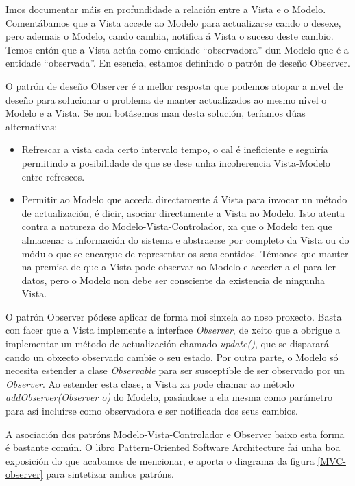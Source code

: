 Imos documentar máis en profundidade a relación entre a Vista e o Modelo. Comentábamos que a Vista accede ao Modelo para actualizarse cando o desexe, pero ademais o Modelo, cando cambia, notifica á Vista o suceso deste cambio. Temos entón que a Vista actúa como entidade ``observadora'' dun Modelo que é a entidade ``observada''. En esencia, estamos definindo o patrón de deseño Observer.

O patrón de deseño Observer é a mellor resposta que podemos atopar a nivel de deseño para solucionar o problema de manter actualizados ao mesmo nivel o Modelo e a Vista. Se non botásemos man desta solución, teríamos dúas alternativas:

\begin{itemize}
\item Refrescar a vista cada certo intervalo tempo, o cal é ineficiente e seguiría permitindo a posibilidade de que se dese unha incoherencia Vista-Modelo entre refrescos.
\item Permitir ao Modelo que acceda directamente á Vista para invocar un método de actualización, é dicir, asociar directamente a Vista ao Modelo. Isto atenta contra a natureza do Modelo-Vista-Controlador, xa que o Modelo ten que almacenar a información do sistema e abstraerse por completo da Vista ou do módulo que se encargue de representar os seus contidos. Témonos que manter na premisa de que a Vista pode observar ao Modelo e acceder a el para ler datos, pero o Modelo non debe ser consciente da existencia de ningunha Vista.
\end{itemize} 

O patrón Observer pódese aplicar de forma moi sinxela ao noso proxecto. Basta con facer que a Vista implemente a interface \textit{Observer}, de xeito que a obrigue a implementar un método de actualización chamado \textit{update()}, que se disparará cando un obxecto observado cambie o seu estado. Por outra parte, o Modelo só necesita estender a clase \textit{Observable} para ser susceptible de ser observado por un \textit{Observer}. Ao estender esta clase, a Vista xa pode chamar ao método \textit{addObserver(Observer o)} do Modelo, pasándose a ela mesma como parámetro para así incluírse como observadora e ser notificada dos seus cambios.

A asociación dos patróns Modelo-Vista-Controlador e Observer baixo esta forma é bastante común. O libro Pattern-Oriented Software Architecture \cite{pattern-oriented-software-architecture} fai unha boa exposición do que acabamos de mencionar, e aporta o diagrama da figura \ref{MVC-observer} para sintetizar ambos patróns.

